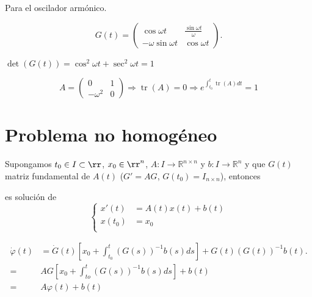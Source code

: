 \begin{ejemplo}{} Para el oscilador armónico. 

\begin{equation}\label{eq:MF_oscilador}G(t)=\begin{pmatrix}
\cos \omega t & \frac{\sin \omega t}{\omega} \\ 
-\omega \sin \omega t & \cos \omega t\end{pmatrix}.
\end{equation}

$\operatorname{det}(G(t))=\cos ^{2} \omega t+\sec ^{2} \omega t=1$

$$
A=\left(\begin{array}{cc}
0 & 1 \\
-\omega^{2} & 0
\end{array}\right) \Rightarrow \operatorname{tr}(A)=0 \Rightarrow e^{\int_{t_0}^t\operatorname{tr}(A) dt}=1
$$
\end{ejemplo}
 
\section{Problema no homogéneo} 


\begin{teorema}{}  Supongamos $t_0\in I\subset\rr$, $x_0\in\rr^n$, $A: I \rightarrow \mathbb{R}^{n\times n}$ y $b: I \rightarrow \mathbb{R}^{n}$ y que $G(t)$ matriz fundamental de $A(t)$ ($G'=AG$, $G(t_0)=I_{n\times n}$), entonces

es solución de
\begin{equation}
\left\{
 \begin{split}
x'(t)&=A(t) x(t)+b(t)\\
x(t_0)&=x_{0}\\
\end{split}
\right.
\end{equation}


\end{teorema}

\begin{demo}
$$
\begin{aligned}
\dot{\varphi}(t) &=\dot{G}(t)\left[x_{0}+\int_{t_{0}}^{t}(G(s))^{-1} b(s) d{s}\right] +G (t)(G(t))^{-1} b(t) . \\
=& A G\left[x_{0}+\int_{t o}^{t}(G(s))^{-1} b(s) d s\right]+b(t) \\
=&A \varphi( t)+b(t)
\end{aligned}
$$

\end{demo}

